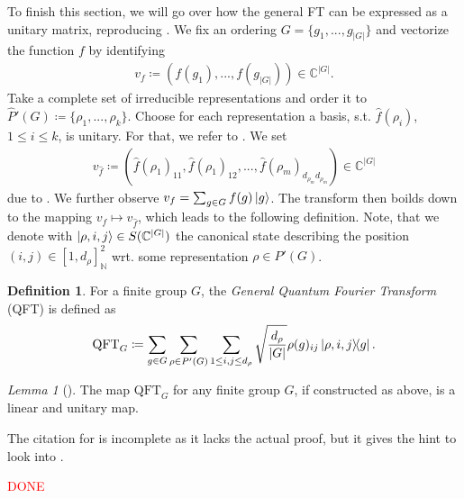 \documentclass[10pt]{amsart}
\theoremstyle{definition}
\newtheorem{definition}{Definition}
\theoremstyle{remark}
\newtheorem{lemma}[theorem]{Lemma}
\begin{document}
    To finish this section, we will go over how the general FT can be expressed as a unitary matrix, reproducing \cite[pp. 27-28]{Lomont2004}. We fix an ordering \(G = \{g_1, ..., g_{|G|}\}\) and vectorize the function \(f\) by identifying
    \begin{align}
        v_f \coloneqq (f(g_1), ..., f(g_{|G|})) \in \mathbb{C}^{|G|}.
    \end{align}
    Take a complete set of irreducible representations and order it to \(\hat{P}'(G) \coloneqq \{\rho_1, ..., \rho_k\}\). Choose for each representation a basis, s.t. \(\hat{f}(\rho_i)\), \(1 \leq i \leq k\), is unitary. For that, we refer to \cite[p. 28]{Lomont2004}. We set
    \begin{align}
        v_{\hat{f}} \coloneqq (\hat{f}(\rho_1)_{11}, \hat{f}(\rho_1)_{12}, ..., \hat{f}(\rho_m)_{d_{\rho_m}d_{\rho_m}}) \in \mathbb{C}^{|G|}
    \end{align}
    due to . We further observe \(v_f = \sum_{g \in G} f(g) \ket{g}\). The transform then boilds down to the mapping \(v_f \mapsto v_{\hat{f}}\), which leads to the following definition. Note, that we denote with \(\ket{\rho, i, j} \in S(\mathbb{C}^{|G|})\) the canonical state describing the position \((i, j) \in [1, d_\rho]_{\mathbb{N}}^2\) wrt. some representation \(\rho \in P'(G)\).
    \begin{definition}
        For a finite group \(G\), the \emph{General Quantum Fourier Transform} (QFT) is defined as
        \begin{align}
            \text{QFT}_G \coloneqq \sum_{g \in G} \sum_{\rho \in P'(G)} \sum_{1 \leq i, j \leq d_\rho} \sqrt{\frac{d_\rho}{|G|}} \rho(g)_{ij} \ketbra{\rho, i, j}{g}.
        \end{align}
    \end{definition}

    \begin{lemma}[{\cite[pp. 27-28]{Lomont2004}}] \label{qft_g_is_unitary_and_linear}
        The map \(\text{QFT}_G\) for any finite group \(G\), if constructed as above, is a linear and unitary map.
    \end{lemma}

    The citation for  is incomplete as it lacks the actual proof, but it gives the hint to look into \cite{Fulton}.

    \textcolor{red}{DONE}
\end{document}
